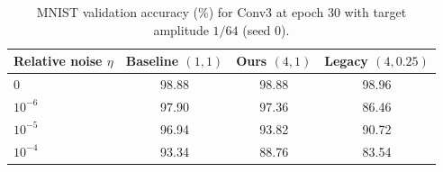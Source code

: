\documentclass{article}
\begin{document}
\begin{table}[htbp]
    \centering
    \caption{MNIST validation accuracy (\%) for Conv3 at epoch 30 with target
    amplitude $1/64$ (seed 0).}
    \label{tab:conv3_target64_read_noise}
    \begin{tabular}{lccc}
        \toprule
        Relative noise $\eta$ & Baseline $(1,1)$ & Ours $(4,1)$ & Legacy $(4,0.25)$ \\
        \midrule
        $0$       & 98.88 & 98.88 & 98.96 \\
        $10^{-6}$ & 97.90 & 97.36 & 86.46 \\
        $10^{-5}$ & 96.94 & 93.82 & 90.72 \\
        $10^{-4}$ & 93.34 & 88.76 & 83.54 \\
        \bottomrule
    \end{tabular}
\end{table}
\end{document}

